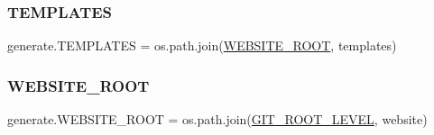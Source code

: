 \subsubsection{\texorpdfstring{T\+E\+M\+P\+L\+A\+T\+ES}{TEMPLATES}}
{\footnotesize\ttfamily generate.\+T\+E\+M\+P\+L\+A\+T\+ES = os.\+path.\+join(\hyperlink{namespacegenerate_a3cb5a2707122c53bf81da4c33e3f65c4}{W\+E\+B\+S\+I\+T\+E\+\_\+\+R\+O\+OT}, \textquotesingle{}templates\textquotesingle{})}

\mbox{\label{namespacegenerate_a3cb5a2707122c53bf81da4c33e3f65c4}} 
\subsubsection{\texorpdfstring{W\+E\+B\+S\+I\+T\+E\+\_\+\+R\+O\+OT}{WEBSITE\_ROOT}}
{\footnotesize\ttfamily generate.\+W\+E\+B\+S\+I\+T\+E\+\_\+\+R\+O\+OT = os.\+path.\+join(\hyperlink{namespacegenerate_afea39d363835652697e0616074816686}{G\+I\+T\+\_\+\+R\+O\+O\+T\+\_\+\+L\+E\+V\+EL}, \textquotesingle{}website\textquotesingle{})}

